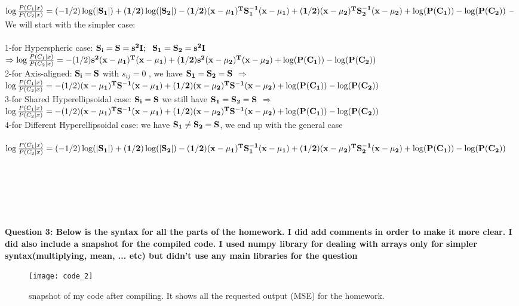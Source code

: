 \documentclass{article}
\begin{document}
$\log\frac{P(C_{1}|x)}{P(C_{2}|x)}=(-1/2)\log(|\bf{S_{1}}|)+(1/2)\log(|\bf{S_{2}}|)-
(1/2)(\bf{x}-\bf{\mu_{1}})^{T}\bf{S}_{1}^{-1}(\bf{x}-\bf{\mu_{1}})+
(1/2) (\bf{x}-\bf{\mu_{2}})^{T}\bf{S}_{2}^{-1} (\bf{x}-\bf{\mu_{2}})+\log(P(C_{1}))-\log(P(C_{2}))$
\newline
\newline
--We will start with the simpler case: \\ \\
1-for Hyperspheric case:
$\bf{S_{i}}=\bf{S}=s^{2}\bf{I};~~\bf{S_{1}} =\bf{S_{2}}=s^{2}\bf{I}$ \hfill \break
$\Rightarrow\log\frac{P(C_{1}|x)}{P(C_{2}|x)}=-
(1/2)\bf{s}^{2}(\bf{x}-\bf{\mu_{1}})^{T}(\bf{x}-\bf{\mu_{1}})+
(1/2)\bf{s}^{2}(\bf{x}-\bf{\mu_{2}})^{T}(\bf{x}-\bf{\mu_{2}})+\log(P(C_{1}))-\log(P(C_{2}))$  \newline
\\
2-for Axis-aligned:
\newline
$\bf{S_{i}}=\bf{S}$ with $s_{ij}=0$ , we have $\bf{S_{1}}=\bf{S_{2}}=\bf{S}$
$\Rightarrow$ $\log\frac{P(C_{1}|x)}{P(C_{2}|x)}=-
(1/2)(\bf{x}-\bf{\mu_{1}})^{T}\bf{S}^{-1}(\bf{x}-\bf{\mu_{1}})+
(1/2) (\bf{x}-\bf{\mu_{2}})^{T}\bf{S}^{-1} (\bf{x}-\bf{\mu_{2}})+\log(P(C_{1}))-\log(P(C_{2}))$   \newline
\\
3-for Shared Hyperellipsoidal case:
$\bf{S_{i}}=\bf{S}$ we still have $\bf{S_{1}}=\bf{S_{2}}=\bf{S}$
$\Rightarrow$ $\log\frac{P(C_{1}|x)}{P(C_{2}|x)}=-
(1/2)(\bf{x}-\bf{\mu_{1}})^{T}\bf{S}^{-1}(\bf{x}-\bf{\mu_{1}})+
(1/2) (\bf{x}-\bf{\mu_{2}})^{T}\bf{S}^{-1} (\bf{x}-\bf{\mu_{2}})+\log(P(C_{1}))-\log(P(C_{2}))$   \newline
\\
4-for Different Hyperellipsoidal case:
 we have $\bf{S_{1}}\neq\bf{S_{2}}=\bf{S}$, we end up with the general case
 \\ \\
 $\log\frac{P(C_{1}|x)}{P(C_{2}|x)}=(-1/2)\log(|\bf{S_{1}}|)+(1/2)\log(|\bf{S_{2}}|)-
 (1/2)(\bf{x}-\bf{\mu_{1}})^{T}\bf{S}_{1}^{-1}(\bf{x}-\bf{\mu_{1}})+
 (1/2) (\bf{x}-\bf{\mu_{2}})^{T}\bf{S}_{2}^{-1} (\bf{x}-\bf{\mu_{2}})+\log(P(C_{1}))-\log(P(C_{2}))$
 \newline
\\
\\
\\
\\
\\
\\
\\
\bf{Question 3:}
\newline
Below is the syntax for all the parts of the homework. I did add comments in order to make it more clear. I did also include a snapshot for the compiled code. I used numpy library for dealing with arrays only for simpler syntax(multiplying, mean, ... etc) but didn't use any main
libraries for the question
\begin{figure}
  \texttt{[image: code\_2]}
  \caption{snapshot of my code after compiling. It shows all the requested output (MSE) for the homework.}
\end{figure}


\end{document}
